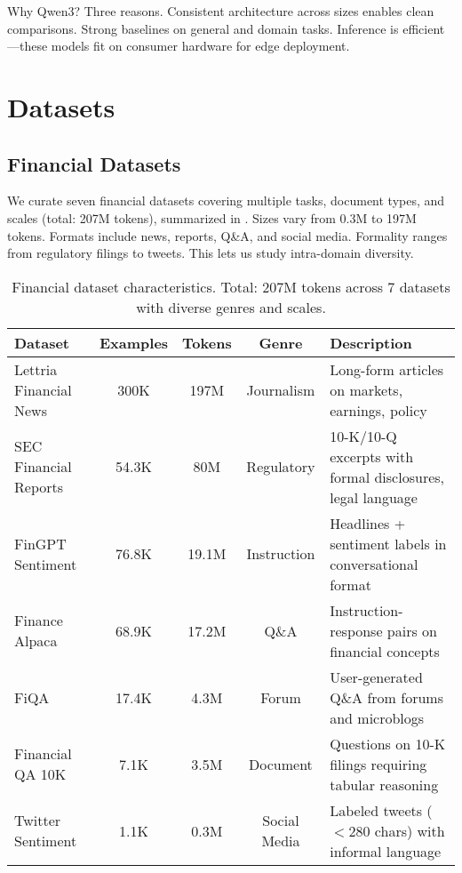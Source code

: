 Why Qwen3? Three reasons. Consistent architecture across sizes enables clean comparisons. Strong baselines on general and domain tasks. Inference is efficient—these models fit on consumer hardware for edge deployment.

\section{Datasets}

\subsection{Financial Datasets}

We curate seven financial datasets covering multiple tasks, document types, and scales (total: 207M tokens), summarized in . Sizes vary from 0.3M to 197M tokens. Formats include news, reports, Q\&A, and social media. Formality ranges from regulatory filings to tweets. This lets us study intra-domain diversity.

\begin{table}[h]
\centering
\caption[Financial Dataset Characteristics]{Financial dataset characteristics. Total: 207M tokens across 7 datasets with diverse genres and scales.}
\label{tab:financial_datasets}
\small
\begin{tabular}{p{3cm}cccp{5.5cm}}
\toprule
\textbf{Dataset} & \textbf{Examples} & \textbf{Tokens} & \textbf{Genre} & \textbf{Description} \\
\midrule
Lettria Financial News & 300K & 197M & Journalism & Long-form articles on markets, earnings, policy \\
\midrule
SEC Financial Reports & 54.3K & 80M & Regulatory & 10-K/10-Q excerpts with formal disclosures, legal language \\
\midrule
FinGPT Sentiment & 76.8K & 19.1M & Instruction & Headlines + sentiment labels in conversational format \\
\midrule
Finance Alpaca & 68.9K & 17.2M & Q\&A & Instruction-response pairs on financial concepts \\
\midrule
FiQA & 17.4K & 4.3M & Forum & User-generated Q\&A from forums and microblogs \\
\midrule
Financial QA 10K & 7.1K & 3.5M & Document & Questions on 10-K filings requiring tabular reasoning \\
\midrule
Twitter Sentiment & 1.1K & 0.3M & Social Media & Labeled tweets ($<$280 chars) with informal language \\
\bottomrule
\end{tabular}
\end{table}

